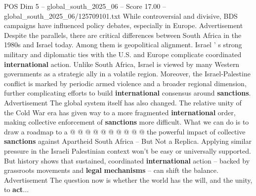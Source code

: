 \begin{textsample}{POS Dim 5 – global\_south\_2025\_06 – Score 17.00 – global\_south\_2025\_06/125709101.txt}
While controversial and divisive, BDS campaigns have influenced policy debates, especially in Europe.
Advertisement Despite the parallels, there are critical differences between South Africa in the 1980s and Israel today.
Among them is geopolitical alignment.
Israel ' s strong military and diplomatic ties with the U.S. and Europe complicate coordinated \textbf{international} action.
Unlike South Africa, Israel is viewed by many Western governments as a strategic ally in a volatile region.
Moreover, the Israel-Palestine conflict is marked by periodic armed violence and a broader regional dimension, further complicating efforts to build \textbf{international} consensus around \textbf{sanctions}.
Advertisement The global system itself has also changed.
The relative unity of the Cold War era has given way to a more fragmented \textbf{international} order, making collective enforcement of \textbf{sanctions} more difficult.
What we can do is to draw a roadmap to a @ @ @ @ @ @ @ @ @ @ the powerful impact of collective \textbf{sanctions} against Apartheid South Africa -- But Not a Replica.
Applying similar pressure in the Israeli Palestinian context won't be easy or universally supported.
But history shows that sustained, coordinated \textbf{international} action -- backed by grassroots movements and \textbf{legal} \textbf{mechanisms} -- can shift the balance.
Advertisement The question now is whether the world has the will, and the unity, to \textbf{act}...

\end{textsample}
